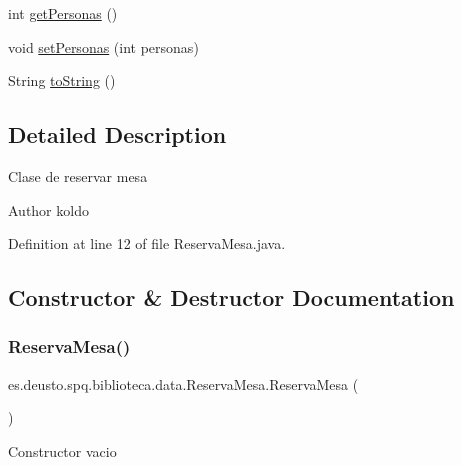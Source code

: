 \begin{DoxyCompactItemize}
\item 
int \mbox{\hyperlink{classes_1_1deusto_1_1spq_1_1biblioteca_1_1data_1_1_reserva_mesa_a8f8ba1a928ae9fae7ae63785fdd06814}{get\+Personas}} ()
\item 
void \mbox{\hyperlink{classes_1_1deusto_1_1spq_1_1biblioteca_1_1data_1_1_reserva_mesa_a48006f59f723921fd3ff524fa040d061}{set\+Personas}} (int personas)
\item 
String \mbox{\hyperlink{classes_1_1deusto_1_1spq_1_1biblioteca_1_1data_1_1_reserva_mesa_a01e0cd01cb0b967cf11b9d2da905a8db}{to\+String}} ()
\end{DoxyCompactItemize}


\subsection{Detailed Description}
Clase de reservar mesa \begin{DoxyAuthor}{Author}
koldo 
\end{DoxyAuthor}


Definition at line 12 of file Reserva\+Mesa.\+java.



\subsection{Constructor \& Destructor Documentation}
\mbox{\label{classes_1_1deusto_1_1spq_1_1biblioteca_1_1data_1_1_reserva_mesa_a26b46f53e77f0c742c43272ca9c76bad}} 
\subsubsection{\texorpdfstring{Reserva\+Mesa()}{ReservaMesa()}\hspace{0.1cm}{\footnotesize\ttfamily [1/2]}}
{\footnotesize\ttfamily es.\+deusto.\+spq.\+biblioteca.\+data.\+Reserva\+Mesa.\+Reserva\+Mesa (\begin{DoxyParamCaption}{ }\end{DoxyParamCaption})}

Constructor vacio 

